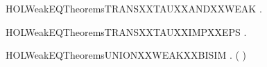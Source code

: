 \begin{SaveVerbatim}{HOLWeakEQTheoremsTRANSXXTAUXXANDXXWEAK}
\HOLTokenTurnstile{} \HOLSymConst{\HOLTokenForall{}}   .  \HOLTokenTransBegin\HOLConst{\ensuremath{\tau}}\HOLTokenTransEnd {} \HOLSymConst{\HOLTokenConj{}}  \HOLTokenWeakTransBegin{}\HOLTokenWeakTransEnd {} \HOLSymConst{\HOLTokenImp{}}  \HOLTokenWeakTransBegin{}\HOLTokenWeakTransEnd {}
\end{SaveVerbatim}
\newcommand{\HOLWeakEQTheoremsTRANSXXTAUXXANDXXWEAK}{\UseVerbatim{HOLWeakEQTheoremsTRANSXXTAUXXANDXXWEAK}}
\begin{SaveVerbatim}{HOLWeakEQTheoremsTRANSXXTAUXXIMPXXEPS}
\HOLTokenTurnstile{} \HOLSymConst{\HOLTokenForall{}} .  \HOLTokenTransBegin\HOLConst{\ensuremath{\tau}}\HOLTokenTransEnd {} \HOLSymConst{\HOLTokenImp{}}   
\end{SaveVerbatim}
\newcommand{\HOLWeakEQTheoremsTRANSXXTAUXXIMPXXEPS}{\UseVerbatim{HOLWeakEQTheoremsTRANSXXTAUXXIMPXXEPS}}
\begin{SaveVerbatim}{HOLWeakEQTheoremsUNIONXXWEAKXXBISIM}
\HOLTokenTurnstile{} \HOLSymConst{\HOLTokenForall{}} .
         \HOLSymConst{\HOLTokenConj{}}   \HOLSymConst{\HOLTokenImp{}}
        (  )
\end{SaveVerbatim}
\newcommand{\HOLWeakEQTheoremsUNIONXXWEAKXXBISIM}{\UseVerbatim{HOLWeakEQTheoremsUNIONXXWEAKXXBISIM}}
